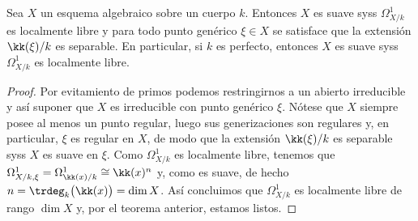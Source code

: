 \begin{cor}\label{thm:vars_sm=gen_sm}
	Sea $X$ un esquema algebraico sobre un cuerpo $k$.
	Entonces $X$ es suave syss $\Omega_{X/k}^1$ es localmente libre y para todo punto genérico $\xi \in X$ se satisface que
	la extensión $\kk(\xi)/k$ es separable.
	En particular, si $k$ es perfecto, entonces $X$ es suave syss $\Omega_{X/k}^1$ es localmente libre.
\end{cor}
\begin{proof}
	Por evitamiento de primos podemos restringirnos a un abierto irreducible y así suponer que $X$ es irreducible con punto genérico $\xi$.
	Nótese que $X$ siempre posee al menos un punto regular, luego sus generizaciones son regulares y, en particular, $\xi$ es regular en $X$, de modo que
	la extensión $\kk(\xi)/k$ es separable syss $X$ es suave en $\xi$.
	Como $\Omega_{X/k}^1$ es localmente libre, tenemos que $\Omega_{X/k, \xi}^1 = \Omega_{\kk(x)/k}^1 \cong \kk(x)^n$ y, como es suave,
	de hecho $n = \trdeg_k\big( \kk(x) \big) = \dim X$.
	Así concluimos que $\Omega_{X/k}^1$ es localmente libre de rango $\dim X$ y, por el teorema anterior, estamos listos.
\end{proof}


